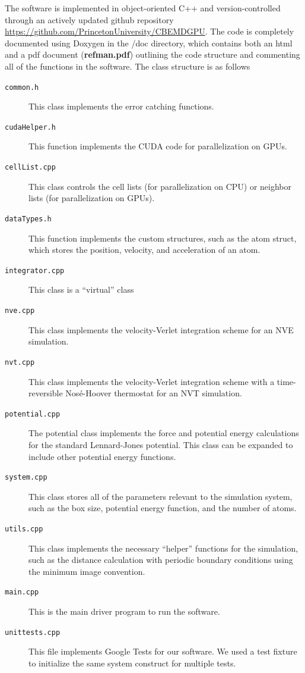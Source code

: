 \documentclass[12pt]{article}
\begin{document}
The software is implemented in object-oriented C++ and version-controlled through an actively updated github repository \url{https://github.com/PrincetonUniversity/CBEMDGPU}. The code is completely documented using Doxygen in the /doc directory, which contains both an html and a pdf document (\textbf{refman.pdf}) outlining the code structure and commenting all of the functions in the software.
%
The class structure is as follows
\begin{description}

\item[\texttt{common.h}] This class implements the error catching functions.

\item[\texttt{cudaHelper.h}] This function implements the CUDA code for parallelization on GPUs.

\item[\texttt{cellList.cpp}] This class controls the cell lists (for parallelization on CPU) or neighbor lists (for parallelization on GPUs).

\item[\texttt{dataTypes.h}] This function implements the custom structures, such as the atom struct, which stores the position, velocity, and acceleration of an atom.
	
\item[\texttt{integrator.cpp}] This class is a ``virtual'' class

\item[\texttt{nve.cpp}] This class implements the velocity-Verlet integration scheme for an NVE simulation.

\item[\texttt{nvt.cpp}] This class implements the velocity-Verlet integration scheme with a time-reversible Nos\'{e}-Hoover thermostat for an NVT simulation.

\item[\texttt{potential.cpp}] The potential class implements the force and potential energy calculations for the standard Lennard-Jones potential.
%
This class can be expanded to include other potential energy functions.

\item[\texttt{system.cpp}] This class stores all of the parameters relevant to the simulation system, such as the box size, potential energy function, and the number of atoms.

\item[\texttt{utils.cpp}] This class implements the necessary ``helper'' functions for the simulation, such as the distance calculation with periodic boundary conditions using the minimum image convention.

\item[\texttt{main.cpp}] This is the main driver program to run the software.

\item[\texttt{unittests.cpp}] This file implements Google Tests for our software.
%
We used a test fixture to initialize the same system construct for multiple tests.

\end{description}
\end{document}
